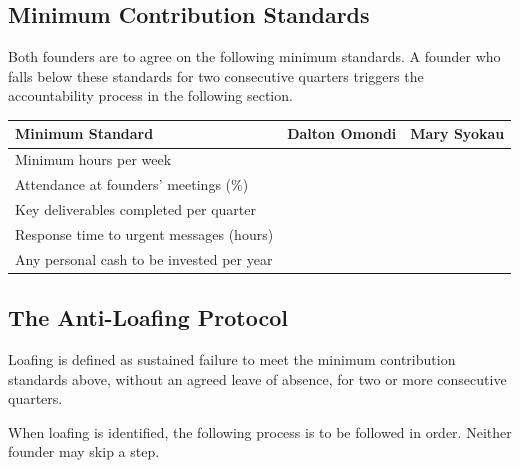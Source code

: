 \documentclass[12pt,a4paper]{article}
\newcommand{\blank}[1][5.5cm]{\underline{\hspace{#1}}}
\begin{document}
\subsection{Minimum Contribution Standards}

Both founders are to agree on the following minimum standards. A founder who falls below these standards for two consecutive quarters triggers the accountability process in the following section.

\begin{tabularx}{\linewidth}{L{5.5cm} C{3cm} C{3cm}}
  \toprule
  \textbf{Minimum Standard} & \textbf{Dalton Omondi} & \textbf{Mary Syokau} \\
  \midrule
  Minimum hours per week                      & \blank[2.5cm] & \blank[2.5cm] \\[0.4em]
  Attendance at founders' meetings (\%)       & \blank[2.5cm] & \blank[2.5cm] \\[0.4em]
  Key deliverables completed per quarter      & \blank[2.5cm] & \blank[2.5cm] \\[0.4em]
  Response time to urgent messages (hours)    & \blank[2.5cm] & \blank[2.5cm] \\[0.4em]
  Any personal cash to be invested per year   & \blank[2.5cm] & \blank[2.5cm] \\
  \bottomrule
\end{tabularx}

\subsection{The Anti-Loafing Protocol}
\label{sec:antiloafing}

Loafing is defined as sustained failure to meet the minimum contribution standards above, without an agreed leave of absence, for two or more consecutive quarters.

When loafing is identified, the following process is to be followed in order. Neither founder may skip a step.
\end{document}
